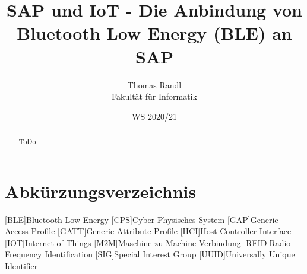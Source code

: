 \documentclass[twoside=true, %
    DIV=15
    ,%
    BCOR=15mm, %
    headinclude=true,
    footinclude=false,
    pagesize,%
    fontsize=12pt,%
    paper=a4,%
    numbers=noenddot
  ]{scrartcl}
\begin{document}
\def\figdir{figures}
\def\tabledir{tables}

\titlehead{
\raggedleft
\texttt{[image: \\figdir/logo-th-rosenheim-2019\_master\_quer\_2c.eps]}
}

\title{
\vspace*{0cm}
SAP und IoT - Die Anbindung von Bluetooth Low Energy (BLE) an SAP
}

\author{
Thomas Randl\\
Fakultät für Informatik}

\date{WS 2020/21}

\maketitle

\begin{abstract}
ToDo
\end{abstract}

\newpage

\tableofcontents

\newpage

\section*{Abkürzungsverzeichnis} %
\begin{acronym}[ECUAFFF]
	[BLE]{Bluetooth Low Energy}
	[CPS]{Cyber Physisches System}
	[GAP]{Generic Access Profile}
	[GATT]{Generic Attribute Profile}
	[HCI]{Host Controller Interface}
	[IOT]{Internet of Things}
	[M2M]{Maschine zu Machine Verbindung}
	[RFID]{Radio Frequency Identification}
	[SIG]{Special Interest Group}
	[UUID]{Universally Unique Identifier}
\end{acronym}









%




\end{document}
